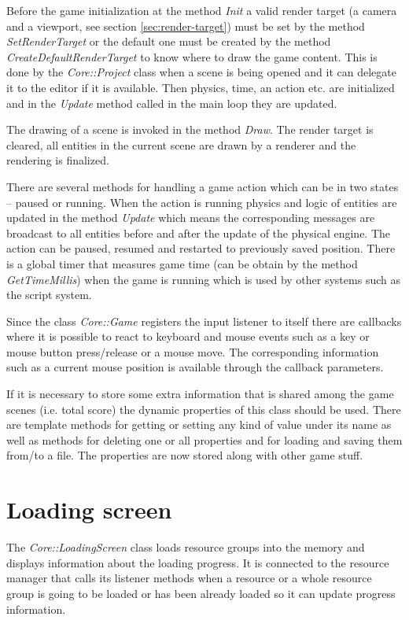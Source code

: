 \documentclass[a4paper, 12pt]{report}
\begin{document}
Before the game initialization at the method \emph{Init} a valid render target (a camera and a viewport, see section \ref{sec:render-target}) must be set by the method \emph{SetRenderTarget} or the default one must be created by the method \emph{CreateDefaultRenderTarget} to know where to draw the game content. This is done by the \emph{Core::Project} class when a scene is being opened and it can delegate it to the editor if it is available. Then physics, time, an action etc. are initialized and in the \emph{Update} method called in the main loop they are updated.

The drawing of a scene is invoked in the method \emph{Draw}. The render target is cleared, all entities in the current scene are drawn by a renderer and the rendering is finalized.

There are several methods for handling a game action which can be in two states -- paused or running. When the action is running physics and logic of entities are updated in the method \emph{Update} which means the corresponding messages are broadcast to all entities before and after the update of the physical engine. The action can be paused, resumed and restarted to previously saved position. There is a global timer that measures game time (can be obtain by the method \emph{GetTimeMillis}) when the game is running which is used by other systems such as the script system.

Since the class \emph{Core::Game} registers the input listener to itself there are callbacks where it is possible to react to keyboard and mouse events such as a key or mouse button press/release or a mouse move. The corresponding information such as a current mouse position is available through the callback parameters.

If it is necessary to store some extra information that is shared among the game scenes (i.e. total score) the dynamic properties of this class should be used. There are template methods for getting or setting any kind of value under its name as well as methods for deleting one or all properties and for loading and saving them from/to a file. The properties are now stored along with other game stuff.

\section{Loading screen}

The \emph{Core::LoadingScreen} class loads resource groups into the memory and displays information about the loading progress. It is connected to the resource manager that calls its listener methods when a resource or a whole resource group is going to be loaded or has been already loaded so it can update progress information.
\end{document}
